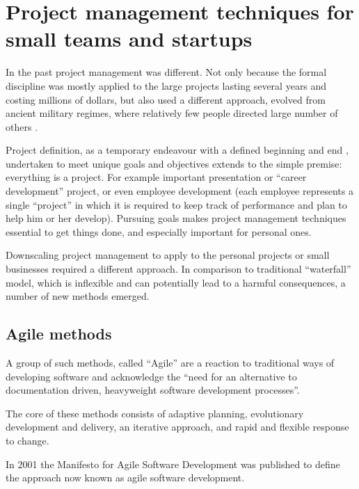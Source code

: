 \chapter{Project management techniques for small teams and startups}
\label{chap:techniques}

In the past project management was different. Not only because the formal discipline was mostly applied to the large projects lasting several years and costing millions of dollars, but also used a different approach, evolved from ancient military regimes, where relatively few people directed large number of others \cite{brandon}.

Project definition, as a temporary endeavour with a defined beginning and end \cite{chatfield}, undertaken to meet unique goals and objectives \cite{nokes} extends to the simple premise: everything is a project. For example important presentation or ``career development'' project, or even  employee development (each employee represents a single ``project'' in which it is required to keep track of performance and plan to help him or her develop). Pursuing goals makes project management techniques essential to get things done, and especially important for personal ones.

Downscaling project management to apply to the personal projects or small businesses required a different approach. In comparison to traditional ``waterfall'' model, which is inflexible and can potentially lead to a harmful consequences, a number of new methods emerged.

\section{Agile methods}

A group of such methods, called ``Agile'' are a reaction to traditional ways of developing software and acknowledge the ``need for an alternative to documentation driven, heavyweight software development processes''.

The core of these methods consists of adaptive planning, evolutionary development and delivery, an iterative approach, and rapid and flexible response to change.

In 2001 the Manifesto for Agile Software Development \cite{agile-manifesto} was published to define the approach now known as agile software development. 

